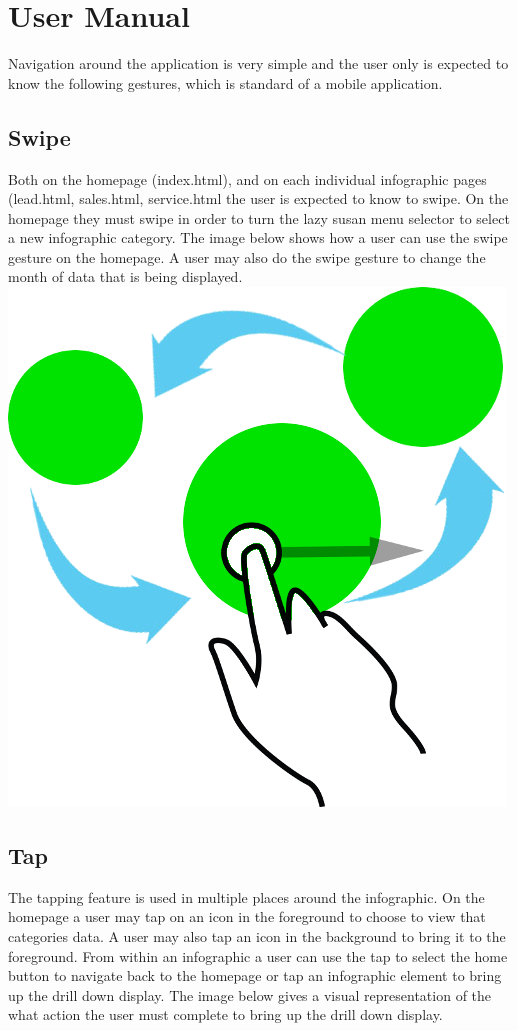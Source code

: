 \documentclass[11pt,a4paper,oneside]{article}
\begin{document}
\section{User Manual}
Navigation around the application is very simple and the user only is expected to know the following gestures, which is standard of a mobile application.\\

\subsection{Swipe} 
Both on the homepage (index.html), and on each individual infographic pages (lead.html, sales.html, service.html the user is expected to know to swipe. On the homepage they must swipe in order to turn the lazy susan menu selector to select a new infographic category. The image below shows how a user can use the swipe gesture on the homepage. A user may also do the swipe gesture to change the month of data that is being displayed. \\

\includegraphics[width=.9\textwidth]{images/switcheroo.png}\\   

\subsection{Tap}
The tapping feature is used in multiple places around the infographic. On the homepage a user may tap on an icon in the foreground to choose to view that categories data. A user may also tap an icon in the background to bring it to the foreground. From within an infographic a user can use the tap to select the home button to navigate back to the homepage or tap an infographic element to bring up the drill down display. The image below gives a visual representation of the what action the user must complete to bring up the drill down display.\\
\end{document}
